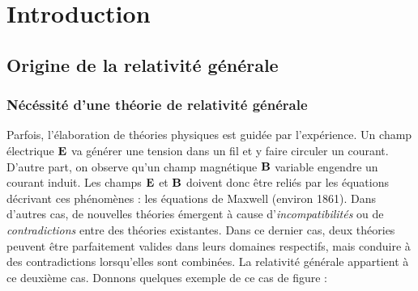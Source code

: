 \chapter{Introduction}

\section{Origine de la relativité générale}


\subsection{Nécéssité d'une théorie de relativité générale}
Parfois, l'élaboration de théories physiques est guidée par l'expérience. Un champ électrique $\bm{\mathrm{E}}$ va générer une tension dans un fil et y faire circuler un courant. D'autre part, on observe qu'un champ magnétique $\bm{\mathrm{B}}$ variable engendre un courant induit. Les champs $\bm{\mathrm{E}}$ et $\bm{\mathrm{B}}$ doivent donc être reliés par les équations décrivant ces phénomènes : les équations de Maxwell (environ 1861).
Dans d'autres cas, de nouvelles théories émergent à cause d'\emph{incompatibilités} ou de \emph{contradictions} entre des théories existantes. Dans ce dernier cas, deux théories peuvent être parfaitement valides dans leurs domaines respectifs, mais conduire à des contradictions lorsqu'elles sont combinées. La relativité générale appartient à ce deuxième cas. Donnons quelques exemple de ce cas de figure :

